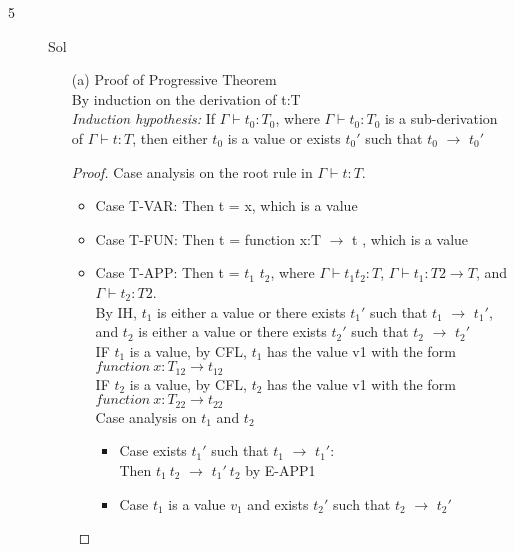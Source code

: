\documentclass{article}
\begin{document}
\begin{description}
        \item [5]{Sol}
            \begin{enumerate}
                \item[(a)]{Proof of Progressive Theorem} \\
                    By induction on the derivation of t:T\\
                    \textit{Induction hypothesis:} If $\Gamma \vdash t_0:T_0$, where $\Gamma \vdash t_0:T_0$ is a sub-derivation of $\Gamma \vdash t:T$, then either $t_0$ is a value or exists $t_0'$ such that  $t_0$ $\rightarrow$ $t_0'$
                    \begin{proof}
                        Case analysis on the root rule in $\Gamma \vdash t:T$.
                        \begin{itemize}
                            \item Case T-VAR: Then t = x, which is a value
                            \item Case T-FUN: Then t = function x:T $\rightarrow$ t , which is a value
                            \item Case T-APP: Then t = $t_1$ $t_2$, where $\Gamma \vdash t_1 t_2 :T$, $\Gamma \vdash t_1:T2 \rightarrow T $, and $\Gamma \vdash t_2:T2$. \\
                                By IH, $t_1$ is either a value or there exists $t_1'$ such that $t_1$ $\rightarrow$ $t_1'$, and $t_2$ is either a value or there exists $t_2'$ such that $t_2$ $\rightarrow$ $t_2'$\\
                                IF $t_1$ is a value, by CFL, $t_1$ has the value v1 with the form $function\ x:T_{12} \rightarrow t_{12}$\\
                                IF $t_2$ is a value, by CFL, $t_2$ has the value v1 with the form $function\ x:T_{22} \rightarrow t_{22}$\\
                                Case analysis on $t_1$ and $t_2$
                                \begin{itemize}
                                    \item Case exists $t_1'$ such that $t_1$ $\rightarrow$ $t_1'$:\\
                                        Then $t_1\ t_2$ $\rightarrow$ $t_1'\ t_2$ by E-APP1
                                    \item Case $t_1$ is a value $v_1$ and exists $t_2'$ such that $t_2$ $\rightarrow$ $t_2'$\\

\end{itemize}
\end{itemize}
\end{proof}
\end{enumerate}
\end{description}
\end{document}
